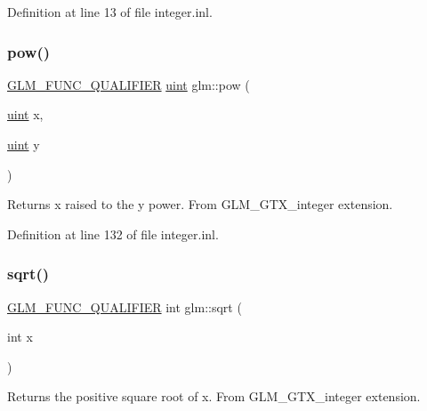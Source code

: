 Definition at line 13 of file integer.\+inl.

\mbox{\label{group__gtx__integer_gaa8229e850c3cc4ad83492fe390ada044}} 
\subsubsection{\texorpdfstring{pow()}{pow()}\hspace{0.1cm}{\footnotesize\ttfamily [2/2]}}
{\footnotesize\ttfamily \hyperlink{setup_8hpp_a33fdea6f91c5f834105f7415e2a64407}{G\+L\+M\+\_\+\+F\+U\+N\+C\+\_\+\+Q\+U\+A\+L\+I\+F\+I\+ER} \hyperlink{group__core__precision_ga4fd29415871152bfb5abd588334147c8}{uint} glm\+::pow (\begin{DoxyParamCaption}\item[{\hyperlink{group__core__precision_ga4fd29415871152bfb5abd588334147c8}{uint}}]{x,  }\item[{\hyperlink{group__core__precision_ga4fd29415871152bfb5abd588334147c8}{uint}}]{y }\end{DoxyParamCaption})}

Returns x raised to the y power. From G\+L\+M\+\_\+\+G\+T\+X\+\_\+integer extension. 

Definition at line 132 of file integer.\+inl.

\mbox{\label{group__gtx__integer_ga78e2e68330e91d350fcfc2f4831cad12}} 
\subsubsection{\texorpdfstring{sqrt()}{sqrt()}\hspace{0.1cm}{\footnotesize\ttfamily [1/2]}}
{\footnotesize\ttfamily \hyperlink{setup_8hpp_a33fdea6f91c5f834105f7415e2a64407}{G\+L\+M\+\_\+\+F\+U\+N\+C\+\_\+\+Q\+U\+A\+L\+I\+F\+I\+ER} int glm\+::sqrt (\begin{DoxyParamCaption}\item[{int}]{x }\end{DoxyParamCaption})}

Returns the positive square root of x. From G\+L\+M\+\_\+\+G\+T\+X\+\_\+integer extension. 

